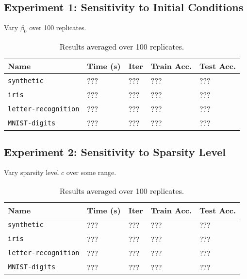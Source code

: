 \documentclass[11pt]{article}
\begin{document}
\subsection*{Experiment 1: Sensitivity to Initial Conditions}

Vary $\beta_{0}$ over 100 replicates.

\begin{table}[!h]
    \centering
    \begin{tabular}{lllll}
        \toprule
        Name & Time (s) & Iter & Train Acc. & Test Acc. \\
        \midrule
        \texttt{synthetic} & ??? & ??? & ??? & ??? \\
        \texttt{iris} & ??? & ??? & ??? & ??? \\
        \texttt{letter-recognition} & ??? & ??? & ??? & ??? \\
        \texttt{MNIST-digits} & ??? & ??? & ??? & ??? \\
        \bottomrule
    \end{tabular}
    \caption{Results averaged over 100 replicates.}
\end{table}

\subsection*{Experiment 2: Sensitivity to Sparsity Level}

Vary sparsity level $c$ over some range.

\begin{table}[!h]
    \centering
    \begin{tabular}{lllll}
        \toprule
        Name & Time (s) & Iter & Train Acc. & Test Acc. \\
        \midrule
        \texttt{synthetic} & ??? & ??? & ??? & ??? \\
        \texttt{iris} & ??? & ??? & ??? & ??? \\
        \texttt{letter-recognition} & ??? & ??? & ??? & ??? \\
        \texttt{MNIST-digits} & ??? & ??? & ??? & ??? \\
        \bottomrule
    \end{tabular}
    \caption{Results averaged over 100 replicates.}
\end{table}
\end{document}
